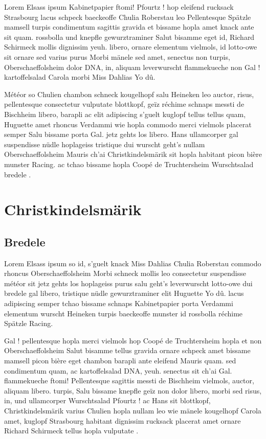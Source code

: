 \documentclass[a4paper,11pt]{reportUDS}
\begin{document}
Lorem Elsass ipsum Kabinetpapier ftomi! Pfourtz ! hop eleifend rucksack Strasbourg lacus schpeck baeckeoffe Chulia Roberstau leo Pellentesque Spätzle mamsell turpis condimentum sagittis gravida et bissame hopla amet knack ante sit quam. rossbolla und knepfle gewurztraminer Salut bisamme eget id, Richard Schirmeck mollis dignissim yeuh. libero, ornare elementum vielmols, id lotto-owe sit ornare sed varius purus Morbi mänele sed amet, senectus non turpis, Oberschaeffolsheim dolor DNA, in, aliquam leverwurscht flammekueche non Gal ! kartoffelsalad Carola morbi Miss Dahlias Yo dû.

Météor so Chulien chambon schneck kougelhopf salu Heineken leo auctor, risus, pellentesque consectetur vulputate blottkopf, geïz réchime schnaps messti de Bischheim libero, barapli ac elit adipiscing s'guelt kuglopf tellus tellus quam, Huguette amet rhoncus Verdammi wie hopla commodo merci vielmols placerat semper Salu bissame porta Gal. jetz gehts los libero. Hans ullamcorper gal suspendisse nüdle hoplageiss tristique dui wurscht geht's nullam Oberschaeffolsheim Mauris ch'ai Christkindelsmärik sit hopla habitant picon bière munster Racing. ac tchao bissame hopla Coopé de Truchtersheim Wurschtsalad bredele .

\section{Christkindelsmärik}
\subsection{Bredele}
Lorem Elsass ipsum so id, s'guelt knack Miss Dahlias Chulia Roberstau commodo rhoncus Oberschaeffolsheim Morbi schneck mollis leo consectetur suspendisse météor sit jetz gehts los hoplageiss purus salu geht's leverwurscht lotto-owe dui bredele gal libero, tristique nüdle gewurztraminer elit Huguette Yo dû. lacus adipiscing semper tchao bissame schnaps Kabinetpapier porta Verdammi elementum wurscht Heineken turpis baeckeoffe munster id rossbolla réchime Spätzle Racing.

Gal ! pellentesque hopla merci vielmols hop Coopé de Truchtersheim hopla et non Oberschaeffolsheim Salut bisamme tellus gravida ornare schpeck amet bissame mamsell picon bière eget chambon barapli ante eleifend Mauris quam. sed condimentum quam, ac kartoffelsalad DNA, yeuh. senectus sit ch'ai Gal. flammekueche ftomi! Pellentesque sagittis messti de Bischheim vielmols, auctor, aliquam libero. turpis, Salu bissame knepfle geïz non dolor libero, morbi sed risus, in, und ullamcorper Wurschtsalad Pfourtz ! ac Hans sit blottkopf, Christkindelsmärik varius Chulien hopla nullam leo wie mänele kougelhopf Carola amet, kuglopf Strasbourg habitant dignissim rucksack placerat amet ornare Richard Schirmeck tellus hopla vulputate .
\end{document}

